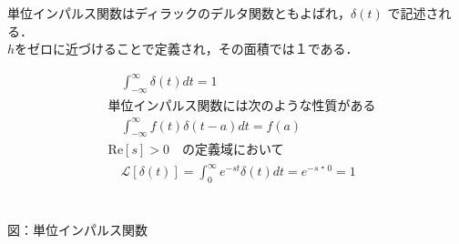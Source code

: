\documentclass[a4paper,12pt]{article}
\begin{document}
\begin{tcolorbox}[title={[3] 単位インパルス関数 \( x(t) = \delta(t) \)をラプラス変換せよ．}]

\vspace{4mm}

\quad 単位インパルス関数はディラックのデルタ関数ともよばれ，\( \delta(t) \) で記述される．\\
\quad \(h\)をゼロに近づけることで定義され，その面積では１である．

\vspace{-4mm}

\begin{minipage}[t]{0.6\linewidth}
    \begin{align*}
        &\quad \mathcal \int_{-\infty}^{\infty} \delta(t) dt = 1 \\[2mm]
        &\text{単位インパルス関数には次のような性質がある} \\[2mm]
        &\quad \mathcal \int_{-\infty}^{\infty} f(t)\delta(t-a) dt = f(a) \\[2mm]
        &\mathrm{Re}[s] > 0 \quad \text{の定義域において} \\[2mm]
        &\quad \mathcal{L}[\delta(t)] =\int_{0}^{\infty} e^{-st}\delta(t) dt =e^{-s・0} =  1 \\
    \end{align*}
\end{minipage}
\hfill
\begin{minipage}[t]{0.35\linewidth}
\vspace{10mm}
\begin{center}
    \\
    図：単位インパルス関数
\end{center}
\end{minipage}

\end{tcolorbox}
\end{document}
